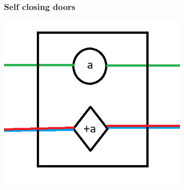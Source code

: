 \documentclass{beamer}
\begin{document}
\begin{frame}
  \frametitle{Self closing doors}
  \begin{center}
    \includegraphics[width=0.7\textwidth]{res/doors/SelfClosingDoor.png}
  \end{center}
\end{frame}
\end{document}
